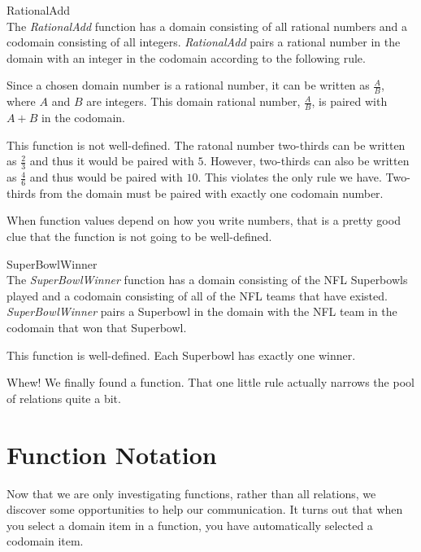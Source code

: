 \documentclass{ximera}
\begin{document}
\begin{example} RationalAdd \\
The \textit{RationalAdd} function has a domain consisting of all rational numbers and a codomain consisting of all integers.  \textit{RationalAdd} pairs a rational number in the domain with an integer in the codomain according to the following rule.

Since a chosen domain number is a rational number, it can be written as $\tfrac{A}{B}$, where $A$ and $B$ are integers. This domain rational number, $\tfrac{A}{B}$, is paired with $A+B$ in the codomain.

This function is not well-defined.  The ratonal number two-thirds can be written as $\tfrac{2}{3}$ and thus it would be paired with $5$.  However, two-thirds can also be written as $\tfrac{4}{6}$ and thus would be paired with $10$.  This violates the only rule we have.  Two-thirds from the domain must be paired with exactly one codomain number.

\begin{warning}
When function values depend on how you write numbers, that is a pretty good clue that the function is not going to be well-defined.
\end{warning}
\end{example}



\begin{example} SuperBowlWinner  \\
The \textit{SuperBowlWinner} function has a domain consisting of the NFL Superbowls played and a codomain consisting of all of the NFL teams that have existed.  \textit{SuperBowlWinner} pairs a Superbowl in the domain with the NFL team in the codomain that won that Superbowl. 

This function is well-defined. Each Superbowl has exactly one winner.
\end{example}


Whew!  We finally found a function. That one little rule actually narrows the pool of relations quite a bit.



\section{Function Notation}

Now that we are only investigating functions, rather than all relations, we discover some opportunities to help our communication.  It turns out that when you select a domain item in a function, you have automatically selected a codomain item.
\end{document}

